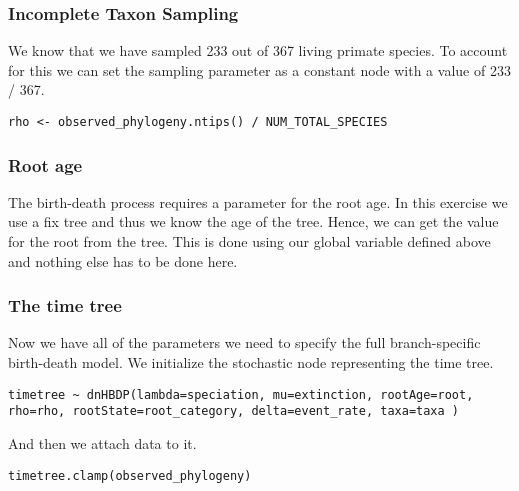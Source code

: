 \subsubsection{Incomplete Taxon Sampling}

We know that we have sampled 233 out of 367 living primate species.
To account for this we can set the sampling parameter as a constant node with a value of 233 / 367.
{\tt \begin{snugshade*}
\begin{lstlisting}
rho <- observed_phylogeny.ntips() / NUM_TOTAL_SPECIES
\end{lstlisting}
\end{snugshade*}}


\subsubsection{Root age}

The birth-death process requires a parameter for the root age.
In this exercise we use a fix tree and thus we know the age of the tree.
Hence, we can get the value for the root from the \citet{MagnusonFord2012} tree.
This is done using our global variable  defined above and nothing else has to be done here.

\subsubsection{The time tree}

Now we have all of the parameters we need to specify the full branch-specific birth-death model.
We initialize the stochastic node representing the time tree.
{\tt \begin{snugshade*}
\begin{lstlisting}
timetree ~ dnHBDP(lambda=speciation, mu=extinction, rootAge=root, rho=rho, rootState=root_category, delta=event_rate, taxa=taxa )
\end{lstlisting}
\end{snugshade*}}
And then we attach data to it.
{\tt \begin{snugshade*}
\begin{lstlisting}
timetree.clamp(observed_phylogeny)
\end{lstlisting}
\end{snugshade*}}

